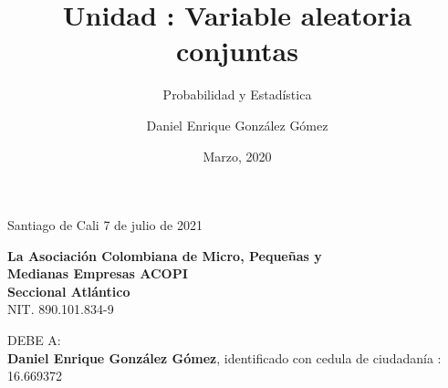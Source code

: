 \documentclass[base=hide,12pt]{elegantbook}
\title{Unidad : Variable aleatoria conjuntas}
\subtitle{Probabilidad y Estadística}
\author{Daniel Enrique González Gómez}
\institute{Pontificia Universidad Javeriana Cali}
\date{Marzo, 2020}
\begin{document}

Santiago de Cali 7 de julio de 2021\\
\begin{center}
	
\textcolor{col4}{\large \bf La Asociación Colombiana de Micro, Pequeñas y \\
	Medianas Empresas ACOPI \\
	Seccional Atlántico } \\

NIT. 890.101.834-9
\end{center}


DEBE A:  \\
{\bf Daniel Enrique González Gómez}, identificado con cedula de ciudadanía : 16.669372 
\\
\end{document}
